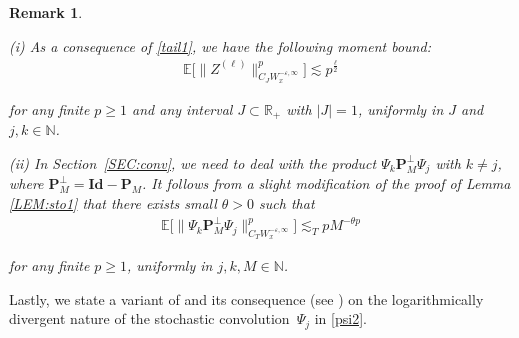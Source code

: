 \documentclass[letterpaper, 11pt,  reqno]{amsart}
\newtheorem{remark}[theorem]{Remark}
\newcommand{\1}{\hspace{0.5mm}\text{I}\hspace{0.2mm}}
\newcommand{\noi}{\noindent}
\newcommand{\R}{\mathbb{R}}
\newcommand{\N}{\mathbb{N}}
\newcommand{\E}{\mathbb{E}}
\newcommand{\Id}{\textbf{Id}}
\newcommand{\ta}{\theta}
\newcommand{\eps}{\varepsilon}
\newcommand{\les}{\lesssim}
\renewcommand{\P}{\mathbf{P}}
\renewcommand{\l}{\ell}
\numberwithin{equation}{section}
\numberwithin{theorem}{section}
\begin{document}
\begin{remark} \rm
\label{REM:sto1a}

(i) As a consequence of  \eqref{tail1}, 
we have the following moment bound:
\begin{align*}
    \E \Big[ \| Z ^{(\l)}\|_{C_J W_x^{- \eps, \infty}}^p \Big] \les p^\frac{\l}{2}
\end{align*}

\noi
for any finite $p \ge 1$
and any interval $J \subset \R_+$ with $|J| = 1$, 
uniformly in $J$ and $j, k \in \N$.



\smallskip

\noi
(ii)
In Section~\ref{SEC:conv}, 
we  need to deal with the product $\Psi_k \P_{M}^\perp \Psi_j$ with $k \neq j$, where 
$\P^\perp_{M} = \Id - \P_{M}$.
It follows from a slight modification of the proof of Lemma \ref{LEM:sto1}
that 
there exists small $\ta > 0$ such that 
\begin{align}
 \E \big[ \| \Psi_k \P_M^\perp \Psi_j \|_{C_T W_x^{- \eps, \infty}}^p \big] \les_{T} 
 p 
 M^{- \ta  p}
\label{mom2}
\end{align}

\noi
\noi
for any finite $p \ge 1$, 
uniformly in $j, k, M \in \N$.



\end{remark}








Lastly, we state a variant of \cite[Lemma~2.4]{GKOT}
and its consequence (see \cite[Subsection 3.2]{GKOT})
on the 
 logarithmically divergent nature of the stochastic convolution~$\Psi_j$
 in \eqref{psi2}. 
\end{document}
